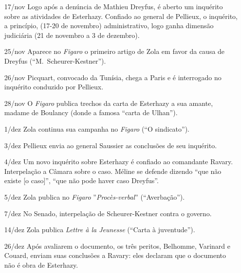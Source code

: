 \begin{itemize}
\item[17/nov] Logo após a denúncia de Mathieu Dreyfus, é aberto um inquérito
sobre as atividades de Esterhazy. Confiado ao general de Pellieux, o inquérito,
a princípio, (17-20 de novembro) administrativo, logo ganha dimensão judiciária
(21 de novembro a 3 de dezembro). 

\item[25/nov] Aparece no \textit{Figaro} o primeiro artigo de Zola em favor da
causa de Dreyfus (``M.~Scheurer-Kestner'').

\item[26/nov] Picquart, convocado da Tunísia, chega a Paris e é interrogado no
inquérito conduzido por Pellieux.

\item[28/nov] O \textit{Figaro}  publica trechos da carta de Esterhazy a sua
amante, madame de Boulancy (donde a famosa ``carta de Ulhan'').

\item[1/dez] Zola continua sua campanha no \textit{Figaro} (``O sindicato'').

\item[3/dez] Pellieux envia ao general Saussier as conclusões de seu inquérito.

\item[4/dez] Um novo inquérito sobre Esterhazy é confiado ao comandante Ravary.
Interpelação a Câmara sobre o caso. Méline se defende dizendo ``que não existe
[o caso]'', ``que não pode haver caso Dreyfus''.

\item[5/dez] Zola publica no \textit{Figaro } ''\textit{Procès-verbal}''
(``Averbação'').

\item[7/dez] No Senado, interpelação de Scheurer-Kestner contra o governo.  

\item[14/dez] Zola publica \textit{Lettre à la Jeunesse} (``Carta à
juventude''). 

\item[26/dez] Após avaliarem o documento, os três peritos, Belhomme, Varinard e
Couard, enviam suas conclusões a Ravary: eles declaram que o documento não é
obra de Esterhazy. 
\end{itemize}

\pagebreak

